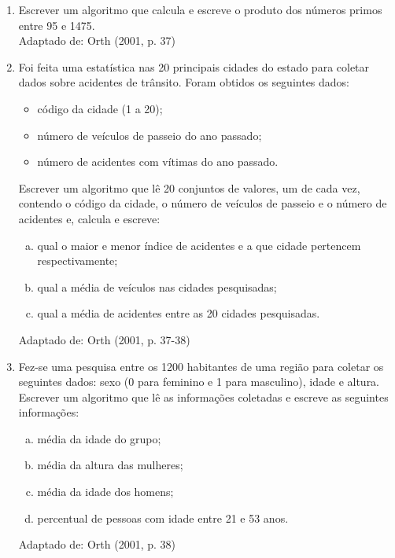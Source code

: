 \documentclass[onecolumn,a4paper,10pt]{report}
\newcommand{\+}{\, + \,}
\newcommand{\<}{\hspace*{-0.4cm}}
\begin{document}
\begin{enumerate}[1.]
\item Escrever um algoritmo que calcula e escreve o produto dos números primos entre 95 e 1475.\\
{\tiny Adaptado de: Orth (2001, p. 37)}

\newpage
\item Foi feita uma estatística nas 20 principais cidades do estado para coletar dados sobre acidentes de trânsito. Foram obtidos os seguintes dados:
\begin{itemize}
    \item código da cidade (1 a 20);
    \item número de veículos de passeio do ano passado;
    \item número de acidentes com vítimas do ano passado.
\end{itemize}
Escrever um algoritmo que lê 20 conjuntos de valores, um de cada vez, contendo o código da cidade, o número de veículos de passeio e o número de acidentes e, calcula e escreve:
\begin{enumerate}[a)]
    \item qual o maior e menor índice de acidentes e a que cidade pertencem respectivamente;
    \item qual a média de veículos nas cidades pesquisadas;
    \item qual a média de acidentes entre as 20 cidades pesquisadas.
\end{enumerate}
{\tiny Adaptado de: Orth (2001, p. 37-38)}

\item Fez-se uma pesquisa entre os 1200 habitantes de uma região para coletar os seguintes dados: sexo (0 para feminino e 1 para masculino), idade e altura. Escrever um algoritmo que lê as informações coletadas e escreve as seguintes informações:
\begin{enumerate}[a)]
    \item média da idade do grupo;
    \item média da altura das mulheres;
    \item média da idade dos homens;
    \item percentual de pessoas com idade entre 21 e 53 anos.
\end{enumerate}
{\tiny Adaptado de: Orth (2001, p. 38)}


\end{enumerate}
\end{document}
